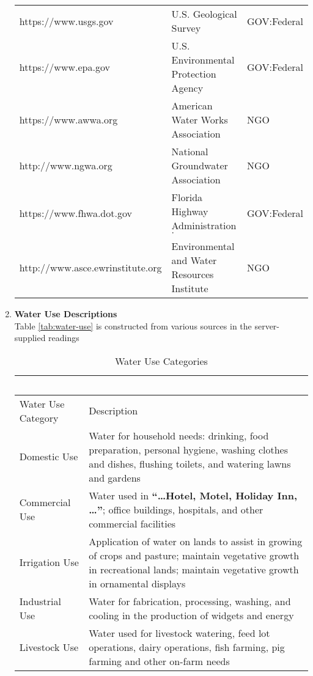 \documentclass[12pt]{article}
\begin{document}
\begin{enumerate}
\begin{table}[htbp]
\begin{tabular}{p{2.2in}p{3.5in}p{0.9in}}
https://www.usgs.gov & U.S. Geological Survey & GOV:Federal\\
https://www.epa.gov & U.S. Environmental Protection Agency & GOV:Federal \\
https://www.awwa.org & American Water Works Association & NGO \\
http://www.ngwa.org & National Groundwater Association & NGO \\
https://www.fhwa.dot.gov & Florida Highway Administration $\cdot$ & GOV:Federal \\
http://www.asce.ewrinstitute.org & Environmental and Water Resources Institute & NGO\\
\hline
\hline
   \end{tabular}
   \label{tab:url-list}
\end{table}
\clearpage
\item{{\textbf{Water Use Descriptions}}}~\\
Table \ref{tab:water-use} is constructed from various sources in the server-supplied readings
\begin{table}[h!]
   \centering
   \caption{Water Use Categories}
   \begin{tabular}{p{1.7in}p{4.3in}} %
   ~ & ~ \\
\hline \hline
Water Use Category & Description \\
\hline
Domestic Use & Water for household needs: drinking, food preparation, personal hygiene, washing clothes and dishes, flushing toilets, and watering lawns and gardens \\
Commercial Use & Water used in \textbf{``\dots Hotel, Motel, Holiday Inn, \dots''}; office buildings, hospitals, and other commercial facilities \\
Irrigation Use & Application of water on lands to assist in growing of crops and pasture; maintain vegetative growth in recreational lands; maintain vegetative growth in ornamental displays\\
Industrial Use & Water for fabrication, processing, washing, and cooling in the production of widgets and energy\\
Livestock Use & Water used for livestock watering, feed lot operations, dairy operations, fish farming, pig farming and other on-farm needs\\

\end{tabular}
\end{table}
\end{enumerate}
\end{document}
